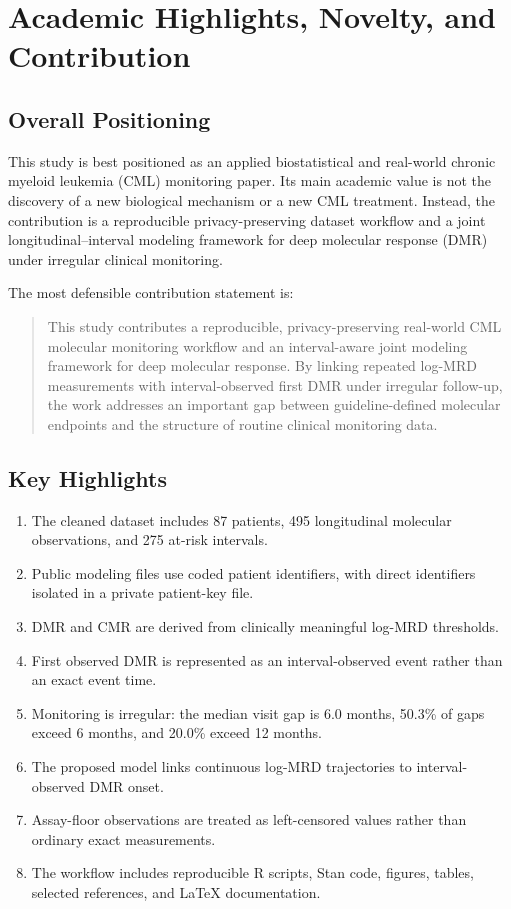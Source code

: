 \section{Academic Highlights, Novelty, and Contribution}

\subsection{Overall Positioning}

This study is best positioned as an applied biostatistical and real-world chronic myeloid leukemia (CML) monitoring paper. Its main academic value is not the discovery of a new biological mechanism or a new CML treatment. Instead, the contribution is a reproducible privacy-preserving dataset workflow and a joint longitudinal--interval modeling framework for deep molecular response (DMR) under irregular clinical monitoring.

The most defensible contribution statement is:
\begin{quote}
This study contributes a reproducible, privacy-preserving real-world CML molecular monitoring workflow and an interval-aware joint modeling framework for deep molecular response. By linking repeated log-MRD measurements with interval-observed first DMR under irregular follow-up, the work addresses an important gap between guideline-defined molecular endpoints and the structure of routine clinical monitoring data.
\end{quote}

\subsection{Key Highlights}

\begin{enumerate}
  \item The cleaned dataset includes 87 patients, 495 longitudinal molecular observations, and 275 at-risk intervals.
  \item Public modeling files use coded patient identifiers, with direct identifiers isolated in a private patient-key file.
  \item DMR and CMR are derived from clinically meaningful log-MRD thresholds.
  \item First observed DMR is represented as an interval-observed event rather than an exact event time.
  \item Monitoring is irregular: the median visit gap is 6.0 months, 50.3\% of gaps exceed 6 months, and 20.0\% exceed 12 months.
  \item The proposed model links continuous log-MRD trajectories to interval-observed DMR onset.
  \item Assay-floor observations are treated as left-censored values rather than ordinary exact measurements.
  \item The workflow includes reproducible R scripts, Stan code, figures, tables, selected references, and LaTeX documentation.
\end{enumerate}

